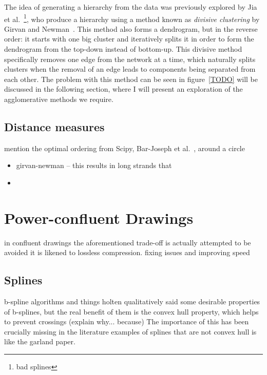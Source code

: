 
The idea of generating a hierarchy from the data was previously explored by Jia et al.~\cite{TODO}\footnote{bad splines}, who produce a hierarchy using a method known as \textit{divisive clustering} by Girvan and Newman~\cite{TODO}. This method also forms a dendrogram, but in the reverse order: it starts with one big cluster and iteratively splits it in order to form the dendrogram from the top-down instead of bottom-up. This divisive method specifically removes one edge from the network at a time, which naturally splits clusters when the removal of an edge leads to components being separated from each other. The problem with this method can be seen in figure~\ref{TODO} will be discussed in the following section, where I will present an exploration of the agglomerative methods we require. 

\subsection{Distance measures}

mention the optimal ordering from Scipy, Bar-Joseph et al.~\cite{TODO}, around a circle

\begin{itemize}
    \item girvan-newman -- this results in long strands that \item
\end{itemize}

\section{Power-confluent Drawings}
in confluent drawings the aforementioned trade-off is actually attempted to be avoided
it is likened to lossless compression.
fixing issues and improving speed
\subsection{Splines}
b-spline algorithms and things
holten qualitatively said some desirable properties of b-splines, but the real benefit of them is the convex hull property, which helps to prevent crossings (explain why... because)
The importance of this has been crucially missing in the literature
examples of splines that are not convex hull is like the garland paper.
